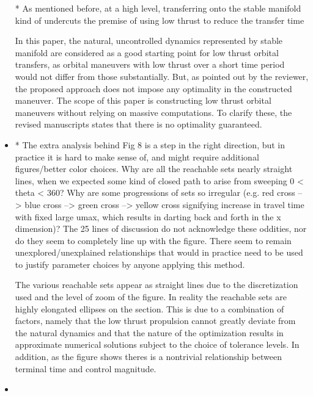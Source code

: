 \documentclass[11pt]{article}
\begin{document}
\begin{itemize}
\begin{itshape}
            * As mentioned before, at a high level, transferring onto the stable
            manifold kind of undercuts the premise of using low thrust to reduce the
            transfer time
        \end{itshape}

        In this paper, the natural, uncontrolled dynamics represented by stable manifold are considered as a good starting point for low thrust orbital transfers, as orbital maneuvers with low thrust over a short time period would not differ from those substantially. 
        But, as pointed out by the reviewer, the proposed approach does not impose any optimality in the constructed maneuver. 
        The scope of this paper is constructing low thrust orbital maneuvers without relying on massive computations. 
        To clarify these, the revised manuscripts states that there is no optimality guaranteed.

    \item
        \begin{itshape}

            * The extra analysis behind Fig 8 is a step in the right direction, but in
            practice it is hard to make sense of, and might require additional
            figures/better color choices.  Why are all the reachable sets nearly
            straight lines, when we expected some kind of closed path to arise from
            sweeping 0 < theta < 360?  Why are some progressions of sets so irregular
            (e.g. red cross --> blue cross --> green cross --> yellow cross signifying
            increase in travel time with fixed large umax, which results in darting
            back and forth in the x dimension)?  The 25 lines of discussion do not
            acknowledge these oddities, nor do they seem to completely line up with the
            figure.  There seem to remain unexplored/unexplained relationships that
            would in practice need to be used to justify parameter choices by anyone
            applying this method.   
        \end{itshape}
        
        The various reachable sets appear as straight lines due to the discretization used and the level of zoom of the figure.
        In reality the reachable sets are highly elongated ellipses on the \Poincare section.
        This is due to a combination of factors, namely that the low thrust propulsion cannot greatly deviate from the natural dynamics and that the nature of the optimization results in approximate numerical solutions subject to the choice of tolerance levels.
        In addition, as the figure shows theres is a nontrivial relationship between terminal time and control magnitude. 
    \item
        \begin{itshape}


\end{itshape}
\end{itemize}
\end{document}
